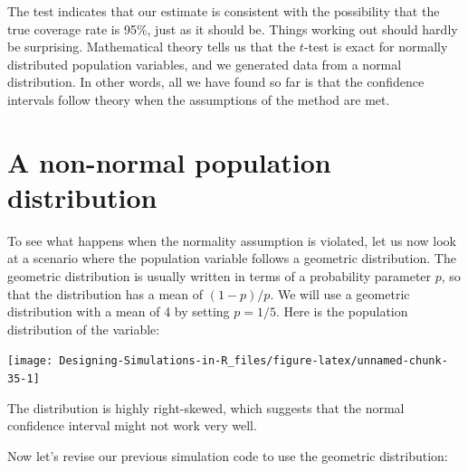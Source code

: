 \documentclass[
]{book}
\newenvironment{Shaded}{\begin{snugshade}}{\end{snugshade}}
\newcommand{\AttributeTok}[1]{\textcolor[rgb]{0.13,0.29,0.53}{#1}}
\newcommand{\DecValTok}[1]{\textcolor[rgb]{0.00,0.00,0.81}{#1}}
\newcommand{\FunctionTok}[1]{\textcolor[rgb]{0.13,0.29,0.53}{\textbf{#1}}}
\newcommand{\NormalTok}[1]{#1}
\newcommand{\OtherTok}[1]{\textcolor[rgb]{0.56,0.35,0.01}{#1}}
\newcommand{\SpecialCharTok}[1]{\textcolor[rgb]{0.81,0.36,0.00}{\textbf{#1}}}
\begin{document}
The test indicates that our estimate is consistent with the possibility that the true coverage rate is 95\%, just as it should be.
Things working out should hardly be surprising.
Mathematical theory tells us that the \(t\)-test is exact for normally distributed population variables, and we generated data from a normal distribution.
In other words, all we have found so far is that the confidence intervals follow theory when the assumptions of the method are met.

\section{A non-normal population distribution}\label{a-non-normal-population-distribution}

To see what happens when the normality assumption is violated, let us now look at a scenario where the population variable follows a geometric distribution.
The geometric distribution is usually written in terms of a probability parameter \(p\), so that the distribution has a mean of \((1 - p) / p\).
We will use a geometric distribution with a mean of 4 by setting \(p = 1/5\).
Here is the population distribution of the variable:

\begin{center}\texttt{[image: Designing-Simulations-in-R\_files/figure-latex/unnamed-chunk-35-1]} \end{center}

The distribution is highly right-skewed, which suggests that the normal confidence interval might not work very well.

Now let's revise our previous simulation code to use the geometric distribution:

\begin{Shaded}
\end{Shaded}
\end{document}
